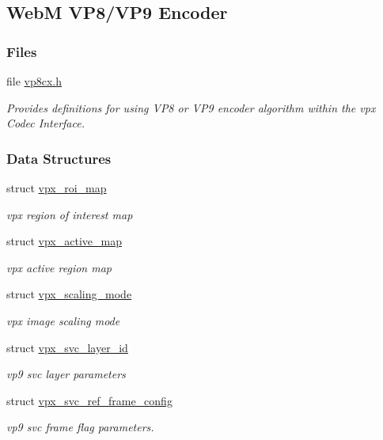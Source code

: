 \hypertarget{group__vp8__encoder}{}\subsection{WebM V\+P8/\+V\+P9 Encoder}
\label{group__vp8__encoder}
\subsubsection*{Files}
\begin{DoxyCompactItemize}
\item 
file \hyperlink{vp8cx_8h}{vp8cx.\+h}
\begin{DoxyCompactList}\small\item\em Provides definitions for using V\+P8 or V\+P9 encoder algorithm within the vpx Codec Interface. \end{DoxyCompactList}\end{DoxyCompactItemize}
\subsubsection*{Data Structures}
\begin{DoxyCompactItemize}
\item 
struct \hyperlink{structvpx__roi__map}{vpx\+\_\+roi\+\_\+map}
\begin{DoxyCompactList}\small\item\em vpx region of interest map \end{DoxyCompactList}\item 
struct \hyperlink{structvpx__active__map}{vpx\+\_\+active\+\_\+map}
\begin{DoxyCompactList}\small\item\em vpx active region map \end{DoxyCompactList}\item 
struct \hyperlink{structvpx__scaling__mode}{vpx\+\_\+scaling\+\_\+mode}
\begin{DoxyCompactList}\small\item\em vpx image scaling mode \end{DoxyCompactList}\item 
struct \hyperlink{structvpx__svc__layer__id}{vpx\+\_\+svc\+\_\+layer\+\_\+id}
\begin{DoxyCompactList}\small\item\em vp9 svc layer parameters \end{DoxyCompactList}\item 
struct \hyperlink{structvpx__svc__ref__frame__config}{vpx\+\_\+svc\+\_\+ref\+\_\+frame\+\_\+config}
\begin{DoxyCompactList}\small\item\em vp9 svc frame flag parameters. \end{DoxyCompactList}\end{DoxyCompactItemize}
